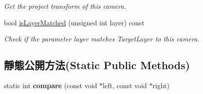 \begin{DoxyCompactItemize}
\begin{DoxyCompactList}\small\item\em Get the project transform of this camera. \end{DoxyCompactList}\item 
bool \hyperlink{class_i_dream_sky_1_1_camera_component_a38e7ee545e4981d3285df17f89561c24}{is\+Layer\+Matched} (unsigned int layer) const 
\begin{DoxyCompactList}\small\item\em Check if the parameter layer matches Target\+Layer to this camera. \end{DoxyCompactList}\end{DoxyCompactItemize}
\subsection*{靜態公開方法(Static Public Methods)}
\begin{DoxyCompactItemize}
\item 
static int {\bfseries compare} (const void $\ast$left, const void $\ast$right)\hypertarget{class_i_dream_sky_1_1_camera_component_a01e3c4027e51ef82206627057d824a18}{}\label{class_i_dream_sky_1_1_camera_component_a01e3c4027e51ef82206627057d824a18}

\end{DoxyCompactItemize}
